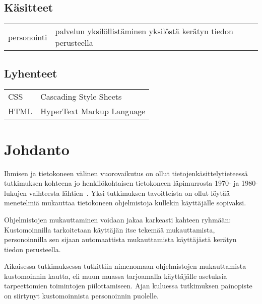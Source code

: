 \documentclass[finnish, 12pt, a4paper, elec, utf8, a-1b, online]{aaltothesis}
\date{xx.xx.2022}
\begin{document}
\makecoverpage{}

\makecopyrightpage{}

\begin{abstractpage}[finnish]
\end{abstractpage}

\thesistableofcontents{}


\subsection*{Käsitteet}

\begin{tabular}{ll}
personointi & palvelun yksilöllistäminen yksilöstä kerätyn tiedon perusteella
\end{tabular}

\subsection*{Lyhenteet}

\begin{tabular}{ll}
CSS & Cascading Style Sheets \\
HTML & HyperText Markup Language
\end{tabular}

\cleardoublepage{}

\section{Johdanto}

Ihmisen ja tietokoneen välinen vuorovaikutus on ollut tietojenkäsittelytieteessä
tutkimuksen kohteena jo henkilökohtaisen tietokoneen läpimurrosta 1970- ja
1980-lukujen vaihteesta lähtien~\cite{10.1145/800178.810088}. Yksi tutkimuksen
tavoitteista on ollut löytää menetelmiä mukauttaa tietokoneen ohjelmistoja
kullekin käyttäjälle sopivaksi.

Ohjelmistojen mukauttaminen voidaan jakaa karkeasti kahteen ryhmään:
Kustomoinnilla tarkoitetaan käyttäjän itse tekemää mukauttamista, personoinnilla
sen sijaan automaattista mukauttamista käyttäjästä kerätyn tiedon
perusteella.~\cite{10.1108/03090560710737534}

Aikaisessa tutkimuksessa tutkittiin nimenomaan ohjelmistojen mukauttamista
kustomoinnin kautta, eli muun muassa tarjoamalla käyttäjälle asetuksia
tarpeettomien toimintojen piilottamiseen. Ajan kuluessa tutkimuksen painopiste
on siirtynyt kustomoinnista personoinnin puolelle.
\end{document}

